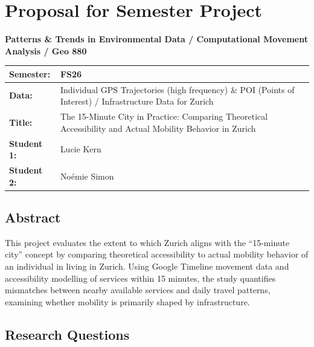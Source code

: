 \documentclass[
  letterpaper,
  DIV=11,
  numbers=noendperiod]{scrartcl}
\author{}
\date{}
\begin{document}
\section{Proposal for Semester
Project}\label{proposal-for-semester-project}

\textbf{Patterns \& Trends in Environmental Data / Computational
Movement Analysis / Geo 880}

\begin{longtable}[]{@{}
  >{\raggedright\arraybackslash}p{}
  >{\raggedright\arraybackslash}p{}@{}}
\toprule\noalign{}
\begin{minipage}[b]{\linewidth}\raggedright
Semester:
\end{minipage} & \begin{minipage}[b]{\linewidth}\raggedright
FS26
\end{minipage} \\
\midrule\noalign{}
\endhead
\bottomrule\noalign{}
\endlastfoot
\textbf{Data:} & Individual GPS Trajectories (high frequency) \& POI
(Points of Interest) / Infrastructure Data for Zurich \\
\textbf{Title:} & The 15-Minute City in Practice: Comparing Theoretical
Accessibility and Actual Mobility Behavior in Zurich \\
\textbf{Student 1:} & Lucie Kern \\
\textbf{Student 2:} & Noémie Simon \\
\end{longtable}

\subsection{Abstract}\label{abstract}

This project evaluates the extent to which Zurich aligns with the
``15-minute city'' concept by comparing theoretical accessibility to
actual mobility behavior of an individual in living in Zurich. Using
Google Timeline movement data and accessibility modelling of services
within 15 minutes, the study quantifies mismatches between nearby
available services and daily travel patterns, examining whether mobility
is primarily shaped by infrastructure.

\subsection{Research Questions}\label{research-questions}
\end{document}
